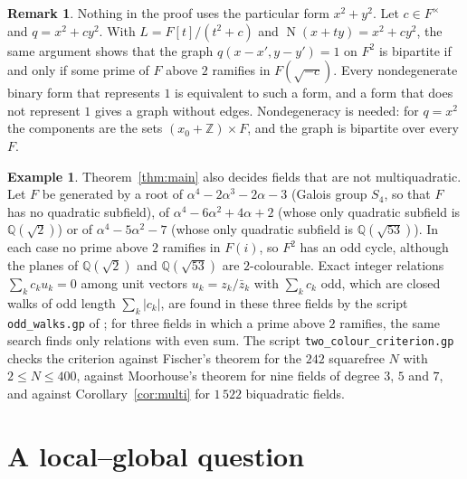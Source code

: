\documentclass[11pt,a4paper]{amsart}
\theoremstyle{definition}
\newtheorem{remark}[theorem]{Remark}
\newtheorem{example}[theorem]{Example}
\newcommand{\Q}{\mathbb{Q}}
\newcommand{\Z}{\mathbb{Z}}
\newcommand{\N}{\operatorname{N}}
\begin{document}
\begin{remark}\label{rem:forms}
Nothing in the proof uses the particular form $x^2+y^2$. Let $c\in F^\times$ and $q=x^2+cy^2$. With
$L=F[t]/(t^2+c)$ and $\N(x+ty)=x^2+cy^2$, the same argument shows that the graph $q(x-x',y-y')=1$ on $F^2$ is
bipartite if and only if some prime of $F$ above $2$ ramifies in $F(\sqrt{-c})$. Every nondegenerate binary form
that represents $1$ is equivalent to such a form, and a form that does not represent $1$ gives a graph without
edges. Nondegeneracy is needed: for $q=x^2$ the components are the sets $(x_0+\Z)\times F$, and the graph is
bipartite over every $F$.
\end{remark}

\begin{example}\label{ex:quartic}
Theorem~\ref{thm:main} also decides fields that are not multiquadratic. Let $F$ be generated by a root of
$\alpha^4-2\alpha^3-2\alpha-3$ (Galois group $S_4$, so that $F$ has no quadratic subfield), of
$\alpha^4-6\alpha^2+4\alpha+2$ (whose only quadratic subfield is $\Q(\sqrt2)$) or of $\alpha^4-5\alpha^2-7$ (whose
only quadratic subfield is $\Q(\sqrt{53})$). In each case no prime above $2$ ramifies in $F(i)$, so $F^2$ has an
odd cycle, although the planes of $\Q(\sqrt2)$ and $\Q(\sqrt{53})$ are $2$-colourable. Exact integer relations
$\sum_k c_ku_k=0$ among unit vectors $u_k=z_k/\bar z_k$ with $\sum_k c_k$ odd, which are closed walks of odd length
$\sum_k|c_k|$, are found in these three fields by the script \texttt{odd\_walks.gp} of \cite{Repo}; for three
fields in which a prime above $2$ ramifies, the same search finds only relations with even sum. The script
\texttt{two\_colour\_criterion.gp} checks the criterion against Fischer's theorem for the $242$ squarefree $N$
with $2\le N\le400$, against Moorhouse's theorem for nine fields of degree $3$, $5$ and $7$, and against
Corollary~\ref{cor:multi} for $1\,522$ biquadratic fields.
\end{example}

\section{A local--global question}\label{sec:lg}
\end{document}
